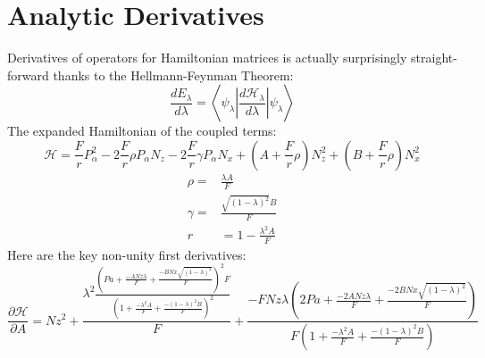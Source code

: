 \documentclass{article}
\begin{document}
\section{Analytic Derivatives}
Derivatives of operators for Hamiltonian matrices is actually surprisingly straight-forward thanks to the Hellmann-Feynman Theorem:
\begin{equation}
\frac{d E_{\lambda}}{d\lambda} = \left\langle \psi_{\lambda} \left|\frac{d\mathscr{H}_{\lambda}}{d\lambda}\right|\psi_{\lambda} \right\rangle
\end{equation}
The expanded Hamiltonian of the coupled terms:
\begin{equation}
	\mathscr{H} = \frac{F}{r}P_{\alpha}^{2} - 2\frac{F}{r}\rho P_{\alpha}N_{z} - 2\frac{F}{r}\gamma P_{\alpha}N_{x} + (A+\frac{F}{r}\rho)N_{z}^{2} + (B+\frac{F}{r}\rho)N_{x}^{2}
\end{equation}
\begin{align}
	\rho =& \frac{\lambda A}{F} \\
	\gamma =& \frac{\sqrt{(1-\lambda)^{2}} B}{F} \\
	r &= 1 - \frac{\lambda^{2} A}{F} 
\end{align}
Here are the key non-unity first derivatives:
\begin{equation}
	\frac{\partial \mathscr{H}}{\partial A} =
		Nz^{2} + \frac{\lambda^{2} \frac{\left( Pa + \frac{ - A Nz \lambda}{F} + \frac{ - B Nx \sqrt{\left( 1 - \lambda \right)^{2}}}{F} \right)^{2} F}{\left( 1 + \frac{ - \lambda^{2} A}{F} + \frac{ - \left( 1 - \lambda \right)^{2} B}{F} \right)^{2}}}{F} + \frac{ - F Nz \lambda \left( 2 Pa + \frac{ - 2 A Nz \lambda}{F} + \frac{ - 2 B Nx \sqrt{\left( 1 - \lambda \right)^{2}}}{F} \right)}{F \left( 1 + \frac{ - \lambda^{2} A}{F} + \frac{ - \left( 1 - \lambda \right)^{2} B}{F} \right)}
\end{equation}
\end{document}
